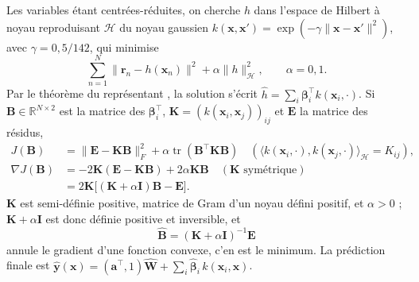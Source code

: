 \documentclass[10pt,a4paper]{article}
\newcommand{\R}{\mathbb{R}}
\newcommand{\vect}[1]{\symbf{#1}}
\newcommand{\T}{^{\top}}
\begin{document}
Les variables étant centrées-réduites, on cherche $h$ dans l'espace de Hilbert à noyau reproduisant $\mathcal H$ du noyau gaussien $k(\vect x,\vect x')=\exp(-\gamma\|\vect x-\vect x'\|^2)$, avec $\gamma=0{,}5/142$, qui minimise
\begin{equation}
\sum_{n=1}^N\|\vect r_n-h(\vect x_n)\|^2+\alpha\|h\|_{\mathcal H}^2,\qquad\alpha=0{,}1 .
\end{equation}
Par le théorème du représentant \cite{scholkopf2001representer}, la solution s'écrit $\hat h=\sum_i\vect\beta_i\T k(\vect x_i,\cdot)$. Si $\mathbf B\in\R^{N\times2}$ est la matrice des $\vect\beta_i\T$, $\mathbf K=(k(\vect x_i,\vect x_j))_{ij}$ et $\mathbf E$ la matrice des résidus,
\begin{align}
J(\mathbf B)&=\|\mathbf E-\mathbf K\mathbf B\|_F^2+\alpha\operatorname{tr}(\mathbf B\T\mathbf K\mathbf B)\quad(\langle k(\vect x_i,\cdot),k(\vect x_j,\cdot)\rangle_{\mathcal H}=K_{ij}),\\
\nabla J(\mathbf B)&=-2\mathbf K(\mathbf E-\mathbf K\mathbf B)+2\alpha\mathbf K\mathbf B\quad(\mathbf K\text{ symétrique})\\
&=2\mathbf K\bigl[(\mathbf K+\alpha\mathbf I)\mathbf B-\mathbf E\bigr].
\end{align}
$\mathbf K$ est semi-définie positive, matrice de Gram d'un noyau défini positif, et $\alpha>0$ ; $\mathbf K+\alpha\mathbf I$ est donc définie positive et inversible, et
\begin{equation}
\hat{\mathbf B}=(\mathbf K+\alpha\mathbf I)^{-1}\mathbf E
\end{equation}
annule le gradient d'une fonction convexe, c'en est le minimum. La prédiction finale est $\hat{\vect y}(\vect x)=(\vect a\T,1)\hat{\mathbf W}+\sum_i\hat{\vect\beta}_i\,k(\vect x_i,\vect x)$.
\end{document}
